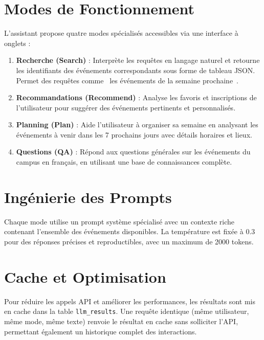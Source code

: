 \documentclass[a4paper,12pt]{report}
\begin{document}
\section{Modes de Fonctionnement}

L'assistant propose quatre modes sp\'{e}cialis\'{e}s accessibles via une interface \`{a} onglets :

\begin{enumerate}[leftmargin=2em]
    \item \textbf{Recherche (Search)} : Interpr\`{e}te les requ\^{e}tes en langage naturel et retourne les identifiants des \'{e}v\'{e}nements correspondants sous forme de tableau JSON. Permet des requ\^{e}tes comme \guillemotleft~les \'{e}v\'{e}nements de la semaine prochaine~\guillemotright.
    \item \textbf{Recommandations (Recommend)} : Analyse les favoris et inscriptions de l'utilisateur pour sugg\'{e}rer des \'{e}v\'{e}nements pertinents et personnalis\'{e}s.
    \item \textbf{Planning (Plan)} : Aide l'utilisateur \`{a} organiser sa semaine en analysant les \'{e}v\'{e}nements \`{a} venir dans les 7 prochains jours avec d\'{e}tails horaires et lieux.
    \item \textbf{Questions (QA)} : R\'{e}pond aux questions g\'{e}n\'{e}rales sur les \'{e}v\'{e}nements du campus en fran\c{c}ais, en utilisant une base de connaissances compl\`{e}te.
\end{enumerate}

\section{Ing\'{e}nierie des Prompts}

Chaque mode utilise un prompt syst\`{e}me sp\'{e}cialis\'{e} avec un contexte riche contenant l'ensemble des \'{e}v\'{e}nements disponibles. La temp\'{e}rature est fix\'{e}e \`{a} 0.3 pour des r\'{e}ponses pr\'{e}cises et reproductibles, avec un maximum de 2000 tokens.

\section{Cache et Optimisation}

Pour r\'{e}duire les appels API et am\'{e}liorer les performances, les r\'{e}sultats sont mis en cache dans la table \texttt{llm\_results}. Une requ\^{e}te identique (m\^{e}me utilisateur, m\^{e}me mode, m\^{e}me texte) renvoie le r\'{e}sultat en cache sans solliciter l'API, permettant \'{e}galement un historique complet des interactions.
\end{document}
